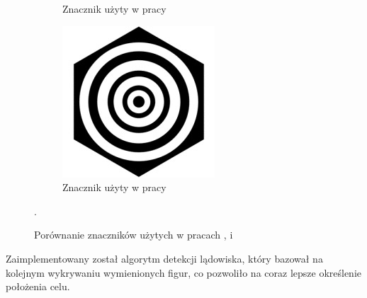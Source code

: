 \begin{figure}
\begin{subfigure}{0.3\textwidth}
		\caption{Znacznik użyty w pracy \cite{H}}
		\label{fig:znacznik_H}
		\end{subfigure}
		\begin{subfigure}{0.3\textwidth}
		\centering
		\includegraphics[width=\textwidth]{znacznik_rings.jpg}
		\caption{Znacznik użyty w pracy \cite{Rings}}
		\label{fig:znacznik_rings}
		\end{subfigure}
	\caption{Porównanie znaczników użytych w pracach \cite{Rings},\cite{Falanga} i \cite{H}}.
	\label{fig:Znaczniki}
\end{figure}

Zaimplementowany został algorytm detekcji lądowiska, który bazował na kolejnym wykrywaniu wymienionych figur, co pozwoliło na coraz lepsze określenie położenia celu.

